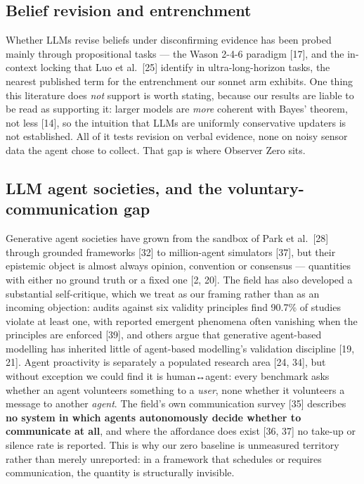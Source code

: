\documentclass[pdflatex,sn-basic]{sn-jnl}
\begin{document}
\hypertarget{belief-revision-and-entrenchment}{%
\subsection{Belief revision and entrenchment}\label{belief-revision-and-entrenchment}}

Whether LLMs revise beliefs under disconfirming evidence has
been probed mainly through propositional tasks --- the Wason 2-4-6 paradigm {[}17{]}, and the in-context locking that Luo et al.~{[}25{]} identify in ultra-long-horizon tasks, the nearest published term for the
entrenchment our sonnet arm exhibits. One thing this literature does \emph{not} support is worth stating, because our
results are liable to be read as supporting it: larger models are \emph{more} coherent with Bayes'
theorem, not less {[}14{]}, so the intuition that LLMs are uniformly conservative updaters is not
established. All of it tests revision on verbal evidence, none on noisy sensor data the agent
chose to collect. That gap is where Observer Zero sits.

\hypertarget{llm-agent-societies-and-the-voluntary-communication-gap}{%
\subsection{LLM agent societies, and the voluntary-communication gap}\label{llm-agent-societies-and-the-voluntary-communication-gap}}

Generative agent societies have
grown from the sandbox of Park et al.~{[}28{]} through grounded frameworks {[}32{]} to million-agent simulators
{[}37{]}, but their epistemic object is almost always opinion, convention or consensus --- quantities
with either no ground truth or a fixed one {[}2, 20{]}. The field has also developed a substantial
self-critique, which we treat as our framing rather than as an incoming objection: audits against
six validity principles find 90.7\% of studies violate at least one, with reported emergent
phenomena often vanishing when the principles are enforced {[}39{]}, and others argue that generative
agent-based modelling has inherited little of agent-based modelling's validation discipline {[}19, 21{]}. Agent proactivity is separately a populated research area {[}24, 34{]}, but without exception we
could find it is human↔agent: every benchmark asks whether an agent volunteers something to a
\emph{user}, none whether it volunteers a message to another \emph{agent}. The field's own communication
survey {[}35{]} describes \textbf{no system in which agents autonomously decide whether to communicate at
all}, and where the affordance does exist {[}36, 37{]} no take-up or silence rate is reported. This
is why our zero baseline is unmeasured territory rather than merely unreported: in a framework
that schedules or requires communication, the quantity is structurally invisible.
\end{document}

